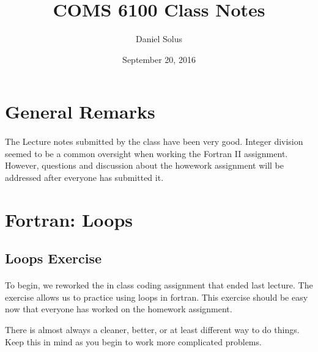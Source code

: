 \documentclass[11pt]{article}
\title{COMS 6100 Class Notes}
\author{Daniel Solus}
\date{September 20, 2016}
\begin{document}
\maketitle

\section{General Remarks}
\paragraph{} The Lecture notes submitted by the class have been very good. Integer division seemed to be a common oversight when working the Fortran II assignment. However, questions and discussion about the howework assignment will be addressed after everyone has submitted it.\\

\section{Fortran: Loops}
\subsection{Loops Exercise}

\paragraph{} To begin, we reworked the in class coding assignment that ended last lecture. The exercise allows us to practice using loops in fortran. This exercise should be easy now that everyone has worked on the homework assignment.\\

\par There is almost always a cleaner, better, or at least different way to do things. Keep this in mind as you begin to work more complicated problems.\\
\end{document}
